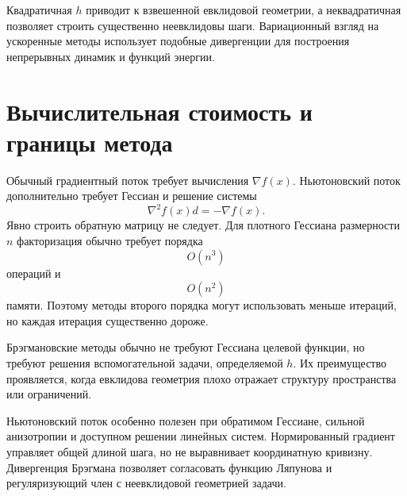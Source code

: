 Квадратичная \(h\) приводит к взвешенной евклидовой геометрии, а
неквадратичная позволяет строить существенно неевклидовы шаги.
Вариационный взгляд на ускоренные методы использует подобные
дивергенции для построения непрерывных динамик и функций энергии. 

\section{Вычислительная стоимость и границы метода}

Обычный градиентный поток требует вычисления \(\nabla f(x)\).
Ньютоновский поток дополнительно требует Гессиан и решение системы
\[
    \nabla^2f(x)d=-\nabla f(x).
\]
Явно строить обратную матрицу не следует. Для плотного Гессиана
размерности \(n\) факторизация обычно требует порядка
\[
    O(n^3)
\]
операций и
\[
    O(n^2)
\]
памяти. Поэтому методы второго порядка могут использовать меньше
итераций, но каждая итерация существенно дороже.

Брэгмановские методы обычно не требуют Гессиана целевой функции, но
требуют решения вспомогательной задачи, определяемой \(h\). Их
преимущество проявляется, когда евклидова геометрия плохо отражает
структуру пространства или ограничений.

Ньютоновский поток особенно полезен при обратимом Гессиане, сильной
анизотропии и доступном решении линейных систем. Нормированный
градиент управляет общей длиной шага, но не выравнивает координатную
кривизну. Дивергенция Брэгмана позволяет согласовать функцию
Ляпунова и регуляризующий член с неевклидовой геометрией задачи.
